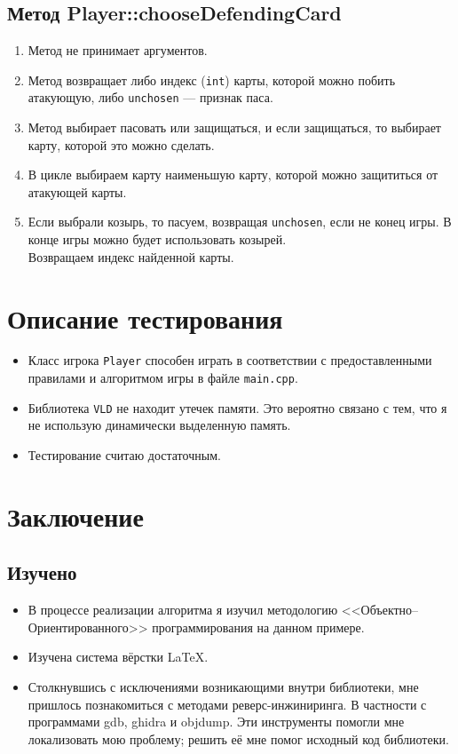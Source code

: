 \documentclass[a4paper,12pt]{article}
\begin{document}
		\subsection {Метод Player::chooseDefendingCard} %
			\begin{enumerate}
				\item 	Метод не принимает аргументов.
				\item 	Метод возвращает либо индекс (\texttt{int}) карты, которой можно побить атакующую, либо \texttt{unchosen} --- признак паса.
				\item 	Метод выбирает пасовать или защищаться, и если защищаться, то выбирает карту, которой это можно сделать.
				\item 	В цикле выбираем карту наименьшую карту, которой можно защититься от атакующей карты.
				\item 	Если выбрали козырь, то пасуем, возвращая \texttt{unchosen}, если не конец игры.
						В конце игры можно будет использовать козырей.\\
						Возвращаем индекс найденной карты.
			\end{enumerate}
		
	\section{Описание тестирования}
		\begin{itemize}
			\item Класс игрока \texttt{Player} способен играть в соответствии с предоставленными правилами и алгоритмом игры в файле \texttt{main.cpp}.
			\item Библиотека \texttt{VLD} не находит утечек памяти. Это вероятно связано с тем, что я не использую динамически выделенную память.
			\item Тестирование считаю достаточным.
		\end{itemize}
	\section{Заключение}
		\subsection{Изучено} 
			\begin{itemize}
				\item 	В процессе реализации алгоритма я изучил методологию <<Объектно--Ориентированного>> программирования на данном примере.
				\item 	Изучена система вёрстки \LaTeX.
				\item 	Столкнувшись с исключениями возникающими внутри библиотеки, мне пришлось познакомиться с методами реверс-инжиниринга.
						В частности с программами \textsf{gdb}, \textsf{ghidra} и \textsf{objdump}.
						Эти инструменты помогли мне локализовать мою проблему; решить её мне помог исходный код библиотеки.
			\end{itemize}
\end{document}
